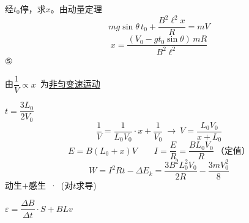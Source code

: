 经$t_0$停，求$x$。由动量定理
\[ mg\sin\theta\,t_0+\frac{B^2\ell^2x}{R}=mV \]
\[ x=\frac{(V_0-gt_0\sin\theta)\,mR}{B^2\ell^2} \]
⑤


由$\dfrac{1}{V}\propto x$\ 为\uline{非匀变速运动}

\quad $t=\dfrac{3L_0}{2V_0}$
\[ \frac{1}{V}=\frac{1}{L_0V_0}\cdot x+\frac{1}{V_0}\ \to\ V=\frac{L_0V_0}{x+L_0} \]
\[ E=B(L_0+x)V\qquad I=\frac{E}{R}=\frac{BL_0V_0}{R}\ \text{（定值）} \]
\[ W=I^2Rt-\Delta E_k=\frac{3B^2L_0^2V_0}{2R}-\frac{3mV_0^2}{8} \]
动生$+$感生\ ·\ (对$t$求导)

$\varepsilon=\dfrac{\Delta B}{\Delta t}\cdot S+BLv$

